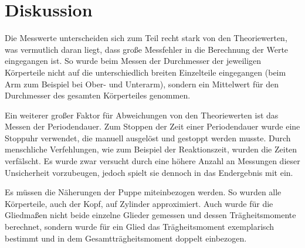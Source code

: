 \newpage
\section{Diskussion}
\label{sec:Diskussion}


Die Messwerte unterscheiden sich zum Teil recht stark von den Theoriewerten, was vermutlich daran liegt, dass große Messfehler
in die Berechnung der Werte eingegangen ist. So wurde beim Messen der Durchmesser der jeweiligen Körperteile nicht auf die unterschiedlich
breiten Einzelteile eingegangen (beim Arm zum Beispiel bei Ober- und Unterarm), sondern ein Mittelwert für den Durchmesser des gesamten
Körperteiles genommen.

Ein weiterer großer Faktor für Abweichungen von den Theoriewerten ist das Messen der Periodendauer. Zum Stoppen der Zeit einer 
Periodendauer wurde eine Stoppuhr verwendet, die manuell ausgelöst und gestoppt werden musste. Durch menschliche Verfehlungen, wie zum Beispiel
der Reaktionszeit, wurden die Zeiten verfälscht. Es wurde zwar versucht durch eine höhere Anzahl an Messungen dieser Unsicherheit vorzubeugen, jedoch
spielt sie dennoch in das Endergebnis mit ein. 



Es müssen die Näherungen der Puppe miteinbezogen werden. So wurden alle
Körperteile, auch der Kopf, auf Zylinder approximiert. Auch wurde für die Gliedmaßen nicht beide einzelne Glieder gemessen und dessen Trägheitsmomente
berechnet, sondern wurde für ein Glied das Trägheitsmoment exemplarisch bestimmt und in dem Gesamtträgheitsmoment doppelt einbezogen.

